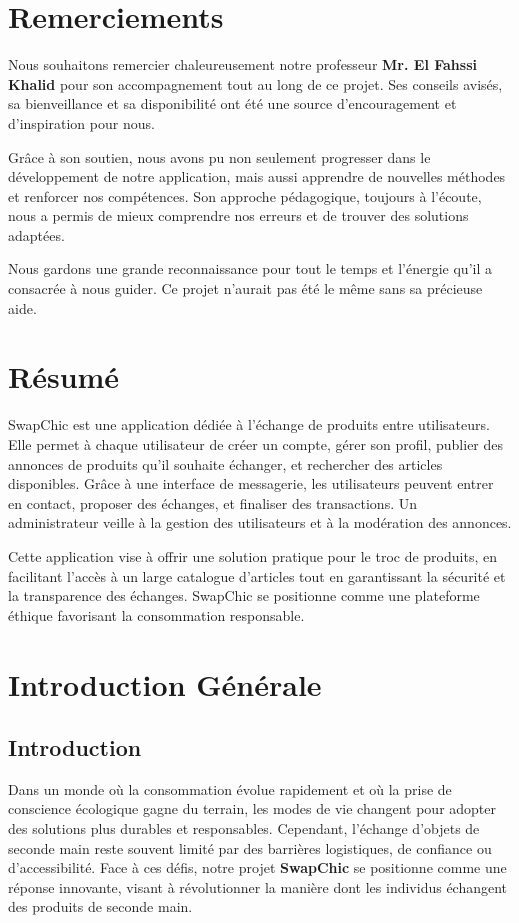 \documentclass[12pt,a4paper]{report}
\begin{document}

	\newpage
	\newpage
	
	\chapter*{Remerciements}
	Nous souhaitons remercier chaleureusement notre professeur \textbf{Mr. El Fahssi Khalid} pour son accompagnement tout au long de ce projet. Ses conseils avisés, sa bienveillance et sa disponibilité ont été une source d'encouragement et d'inspiration pour nous.
	
	Grâce à son soutien, nous avons pu non seulement progresser dans le développement de notre application, mais aussi apprendre de nouvelles méthodes et renforcer nos compétences. Son approche pédagogique, toujours à l'écoute, nous a permis de mieux comprendre nos erreurs et de trouver des solutions adaptées.
	
	Nous gardons une grande reconnaissance pour tout le temps et l'énergie qu'il a consacrée à nous guider. Ce projet n'aurait pas été le même sans sa précieuse aide.
	
	\chapter*{Résumé}
	SwapChic est une application dédiée à l'échange de produits entre utilisateurs. Elle permet à chaque utilisateur de créer un compte, gérer son profil, publier des annonces de produits qu'il souhaite échanger, et rechercher des articles disponibles. Grâce à une interface de messagerie, les utilisateurs peuvent entrer en contact, proposer des échanges, et finaliser des transactions. Un administrateur veille à la gestion des utilisateurs et à la modération des annonces.
	
	Cette application vise à offrir une solution pratique pour le troc de produits, en facilitant l'accès à un large catalogue d'articles tout en garantissant la sécurité et la transparence des échanges. SwapChic se positionne comme une plateforme éthique favorisant la consommation responsable.
	
	\tableofcontents
	\newpage
	\listoffigures
	\newpage
	\listoftables
	\newpage
	
	
	\chapter{Introduction Générale}
	\newpage
	\section{Introduction}
	Dans un monde où la consommation évolue rapidement et où la prise de conscience écologique gagne du terrain, les modes de vie changent pour adopter des solutions plus durables et responsables. Cependant, l'échange d'objets de seconde main reste souvent limité par des barrières logistiques, de confiance ou d'accessibilité. Face à ces défis, notre projet \textbf{SwapChic} se positionne comme une réponse innovante, visant à révolutionner la manière dont les individus échangent des produits de seconde main.
	
\end{document}
